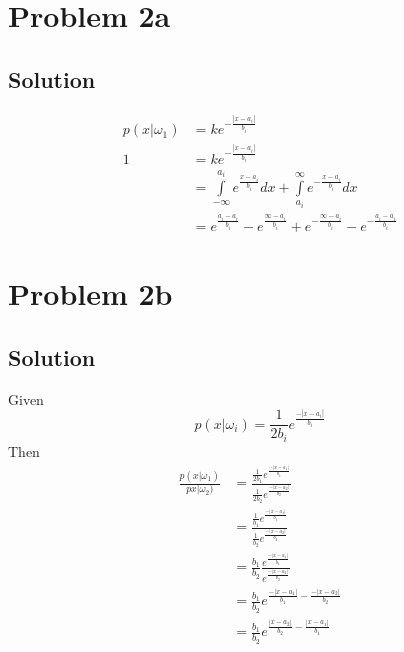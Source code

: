 \documentclass{IEEEtran}
\begin{document}
\newpage

\section{Problem 2a}
\subsection{Solution}
\begin{align*}
    p(x|\omega_1) &= k e^{-\frac{|x-a_i|}{b_i}} \\
    1 &= k e^{-\frac{|x-a_i|}{b_i}} \\
    &= \int\limits_{-\infty}^{a_i} e^{\frac{x-a_i}{b_i}}dx + \int\limits_{a_i}^{\infty} e^{-\frac{x-a_i}{b_i}}dx \\
    &= e^{\frac{a_i-a_i}{b_i}} - e^{\frac{\infty-a_i}{b_i}} + e^{-\frac{\infty-a_i}{b_i}} - e^{-\frac{a_i-a_i}{b_i}}
\end{align*}

\newpage

\section{Problem 2b}
\subsection{Solution}
Given
\begin{equation}
    p(x|\omega_i) = \frac{1}{2b_i}e^{\frac{-|x-a_i|}{b_i}}
\end{equation}
Then
\begin{align*}
    \frac{p(x|\omega_1)}{px|\omega_2)} &= \frac{\frac{1}{2b_1}e^{\frac{-|x-a_1|}{b_1}} }
                                               {\frac{1}{2b_2}e^{\frac{-|x-a_2|}{b_2}} } \\
                                       &= \frac{\frac{1}{b_1}e^{\frac{-|x-a_1|}{b_1}} }
                                               {\frac{1}{b_2}e^{\frac{-|x-a_2|}{b_2}} } \\
                                       &= \frac{b_1}{b_2}\frac{e^{\frac{-|x-a_1|}{b_1}} }
                                                              {e^{\frac{-|x-a_2|}{b_2}} } \\
                                       &= \frac{b_1}{b_2}e^{\frac{-|x-a_1|}{b_1} - \frac{-|x-a_2|}{b_2}} \\
                                       &= \frac{b_1}{b_2}e^{\frac{|x-a_2|}{b_2} - \frac{|x-a_1|}{b_1}}
\end{align*}
\end{document}
